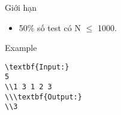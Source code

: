 Giới hạn  
\begin{itemize}
	\item     50\% số test có N  $\le$  1000.   
\end{itemize}
   Example  
\begin{verbatim}
\textbf{Input:}
5
\\1 3 1 2 3
\\\textbf{Output:}
\\3\end{verbatim}